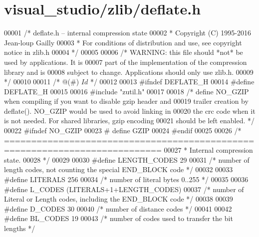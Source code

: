 \hypertarget{visual__studio_2zlib_2deflate_8h_source}{}\section{visual\+\_\+studio/zlib/deflate.h}
\label{visual__studio_2zlib_2deflate_8h_source}

\begin{DoxyCode}
00001 \textcolor{comment}{/* deflate.h -- internal compression state}
00002 \textcolor{comment}{ * Copyright (C) 1995-2016 Jean-loup Gailly}
00003 \textcolor{comment}{ * For conditions of distribution and use, see copyright notice in zlib.h}
00004 \textcolor{comment}{ */}
00005 
00006 \textcolor{comment}{/* WARNING: this file should *not* be used by applications. It is}
00007 \textcolor{comment}{   part of the implementation of the compression library and is}
00008 \textcolor{comment}{   subject to change. Applications should only use zlib.h.}
00009 \textcolor{comment}{ */}
00010 
00011 \textcolor{comment}{/* @(#) $Id$ */}
00012 
00013 \textcolor{preprocessor}{#ifndef DEFLATE\_H}
00014 \textcolor{preprocessor}{#define DEFLATE\_H}
00015 
00016 \textcolor{preprocessor}{#include "zutil.h"}
00017 
00018 \textcolor{comment}{/* define NO\_GZIP when compiling if you want to disable gzip header and}
00019 \textcolor{comment}{   trailer creation by deflate().  NO\_GZIP would be used to avoid linking in}
00020 \textcolor{comment}{   the crc code when it is not needed.  For shared libraries, gzip encoding}
00021 \textcolor{comment}{   should be left enabled. */}
00022 \textcolor{preprocessor}{#ifndef NO\_GZIP}
00023 \textcolor{preprocessor}{#  define GZIP}
00024 \textcolor{preprocessor}{#endif}
00025 
00026 \textcolor{comment}{/* ===========================================================================}
00027 \textcolor{comment}{ * Internal compression state.}
00028 \textcolor{comment}{ */}
00029 
00030 \textcolor{preprocessor}{#define LENGTH\_CODES 29}
00031 \textcolor{comment}{/* number of length codes, not counting the special END\_BLOCK code */}
00032 
00033 \textcolor{preprocessor}{#define LITERALS  256}
00034 \textcolor{comment}{/* number of literal bytes 0..255 */}
00035 
00036 \textcolor{preprocessor}{#define L\_CODES (LITERALS+1+LENGTH\_CODES)}
00037 \textcolor{comment}{/* number of Literal or Length codes, including the END\_BLOCK code */}
00038 
00039 \textcolor{preprocessor}{#define D\_CODES   30}
00040 \textcolor{comment}{/* number of distance codes */}
00041 
00042 \textcolor{preprocessor}{#define BL\_CODES  19}
00043 \textcolor{comment}{/* number of codes used to transfer the bit lengths */}

\end{DoxyCode}
